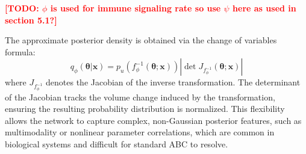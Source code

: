 \documentclass{article}
\newcommand{\todo}[1]{\textcolor{red}{\textbf{[TODO: #1]}}}
\begin{document}
\todo{ $\phi$ is used for immune signaling rate so use $\psi$ here as used in section 5.1?}

The approximate posterior density is obtained via the change of variables formula:
\begin{equation}
q_\phi(\boldsymbol{\theta} | \mathbf{x}) = p_u(f_\phi^{-1}(\boldsymbol{\theta};\mathbf{x})) \left| \det J_{f_\phi^{-1}}(\boldsymbol{\theta}; \mathbf{x}) \right|
\end{equation}
where $J_{f_\phi^{-1}}$ denotes the Jacobian of the inverse transformation. The determinant of the Jacobian tracks the volume change induced by the transformation, ensuring the resulting probability distribution is normalized. This flexibility allows the network to capture complex, non-Gaussian posterior features, such as multimodality or nonlinear parameter correlations, which are common in biological systems and difficult for standard ABC to resolve.
\end{document}
